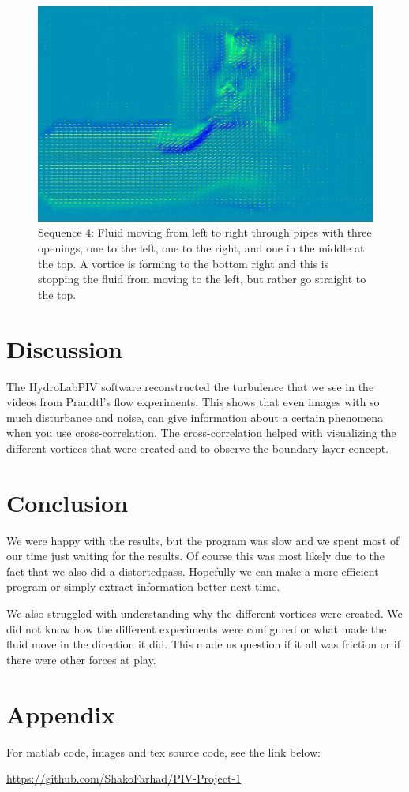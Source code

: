\documentclass[english,a4paper,12pt]{article}
\begin{document}
\begin{figure}[H]
    \centering
    \includegraphics[width=140mm]{sek4.png}
    \caption{Sequence 4: Fluid moving from left to right through pipes with three openings, one to the left, one to the right, and one in the middle at the top. A vortice is forming to the bottom right and this is stopping the fluid from moving to the left, but rather go straight to the top.}
    \label{fig:6}
\end{figure}

\section*{Discussion}
The HydroLabPIV software reconstructed the turbulence that we see in the videos from Prandtl's flow experiments. This shows that even images with so much disturbance and noise, can give information about a certain phenomena when you use cross-correlation. The cross-correlation helped with visualizing the different vortices that were created and to observe the boundary-layer concept. 

\section*{Conclusion}
We were happy with the results, but the program was slow and we spent most of our time just waiting for the results. Of course this was most likely due to the fact that we also did a distortedpass. Hopefully we can make a more efficient program or simply extract information better next time. \\ \bigskip 

We also struggled with understanding why the different vortices were created. We did not know how the different experiments were configured or what made the fluid move in the direction it did. This made us question if it all was friction or if there were other forces at play.

\section*{Appendix}
For matlab code, images and tex source code, see the link below:

\url{https://github.com/ShakoFarhad/PIV-Project-1}


 \bigskip \bigskip
\end{document}
